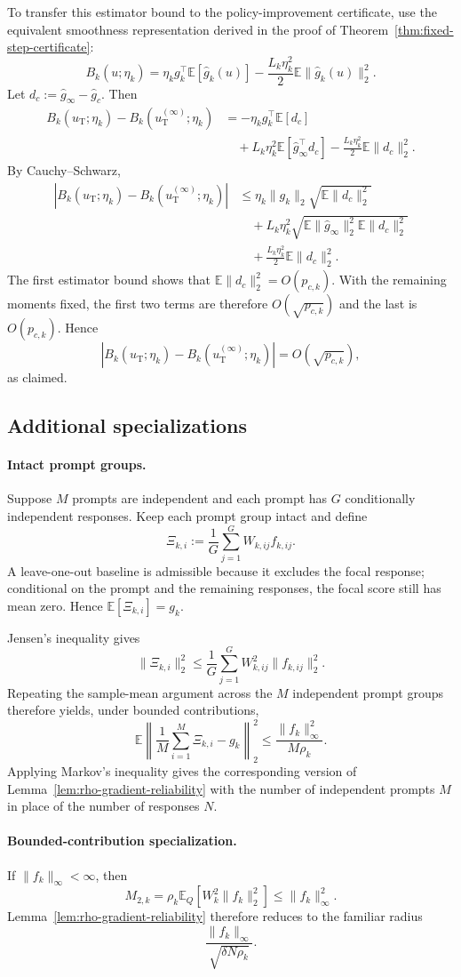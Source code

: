 \documentclass[11pt]{article}
\theoremstyle{remark}
\newcommand{\E}{\mathbb{E}}
\begin{document}
To transfer this estimator bound to the policy-improvement certificate, use
the equivalent smoothness representation derived in the proof of
Theorem~\ref{thm:fixed-step-certificate}:
\[
 B_k(u;\eta_k)
 =
 \eta_k g_k^\top\E[\widehat g_k(u)]
 -
 \frac{L_k\eta_k^2}{2}
 \E\|\widehat g_k(u)\|_2^2.
\]
Let
$d_c:=\widehat g_\infty-\widehat g_c$.
Then
\begin{align*}
 B_k(u_{\mathrm T};\eta_k)
 -
 B_k(u_{\mathrm T}^{(\infty)};\eta_k)
 &=
 -\eta_k g_k^\top\E[d_c]\\
 &\quad+
 L_k\eta_k^2
 \E[\widehat g_\infty^\top d_c]
 -
 \frac{L_k\eta_k^2}{2}
 \E\|d_c\|_2^2.
\end{align*}
By Cauchy--Schwarz,
\begin{align*}
 \left|
 B_k(u_{\mathrm T};\eta_k)
 -
 B_k(u_{\mathrm T}^{(\infty)};\eta_k)
 \right|
 &\le
 \eta_k\|g_k\|_2
 \sqrt{\E\|d_c\|_2^2}\\
 &\quad+
 L_k\eta_k^2
 \sqrt{
 \E\|\widehat g_\infty\|_2^2
 \E\|d_c\|_2^2
 }\\
 &\quad+
 \frac{L_k\eta_k^2}{2}
 \E\|d_c\|_2^2.
\end{align*}
The first estimator bound shows that
$\E\|d_c\|_2^2=O(p_{c,k})$. With the remaining moments fixed, the first two
terms are therefore $O(\sqrt{p_{c,k}})$ and the last is $O(p_{c,k})$.
Hence
\[
 \left|
 B_k(u_{\mathrm T};\eta_k)
 -
 B_k(u_{\mathrm T}^{(\infty)};\eta_k)
 \right|
 =
 O(\sqrt{p_{c,k}}),
\]
as claimed.


\subsection{Additional specializations}

\paragraph{Intact prompt groups.}
Suppose $M$ prompts are independent and each prompt has $G$ conditionally
independent responses. Keep each prompt group intact and define
\[
 \Xi_{k,i}
 :=
 \frac1G\sum_{j=1}^G W_{k,ij}f_{k,ij}.
\]
A leave-one-out baseline is admissible because it excludes the focal response;
conditional on the prompt and the remaining responses, the focal score still
has mean zero. Hence
$\E[\Xi_{k,i}]=g_k$.

Jensen's inequality gives
\[
 \|\Xi_{k,i}\|_2^2
 \le
 \frac1G
 \sum_{j=1}^G
 W_{k,ij}^2\|f_{k,ij}\|_2^2.
\]
Repeating the sample-mean argument across the $M$ independent prompt groups
therefore yields, under bounded contributions,
\[
 \E\left\|
 \frac1M\sum_{i=1}^M\Xi_{k,i}-g_k
 \right\|_2^2
 \le
 \frac{\|f_k\|_\infty^2}{M\rho_k}.
\]
Applying Markov's inequality gives the corresponding version of
Lemma~\ref{lem:rho-gradient-reliability} with the number of independent
prompts $M$ in place of the number of responses $N$.

\paragraph{Bounded-contribution specialization.}
If $\|f_k\|_\infty<\infty$, then
\[
 M_{2,k}
 =
 \rho_k\E_Q[W_k^2\|f_k\|_2^2]
 \le
 \|f_k\|_\infty^2.
\]
Lemma~\ref{lem:rho-gradient-reliability} therefore reduces to the familiar
radius
\[
 \frac{\|f_k\|_\infty}
 {\sqrt{\delta N\rho_k}}.
\]
\end{document}
